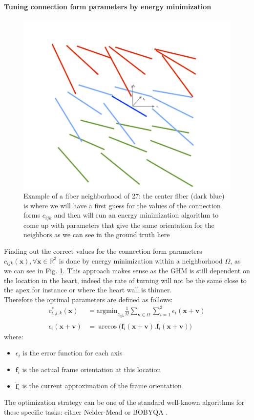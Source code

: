 \paragraph{Tuning connection form parameters by energy minimization} \label{fitting_method}

\begin{figure}[!t]
    \centering
    \includegraphics[width=.78\textwidth]{figures/fibers_neighborhood3d}
    \caption{Example of a fiber neighborhood of 27: the center fiber (dark blue) is where we will have a first guess for the values of the connection forms $c_{ijk}$ and then will run an energy minimization algorithm to come up with parameters that give the same orientation for the neighbors as we can see in the ground truth here}
    \label{fig:fibers_neighborhood3d}
\end{figure}

Finding out the correct values for the connection form parameters $c_{ijk}(\mathbf{x}), \forall \mathbf{x} \in \mathbb{R}^3$ is done by energy minimization within a neighborhood $\Omega$, as we can see in Fig. \ref{fig:fibers_neighborhood3d}. This approach makes sense as the GHM is still dependent on the location in the heart, indeed the rate of turning will not be the same close to the apex for instance or where the heart wall is thinner.\\
Therefore the optimal parameters are defined as follows:
\begin{align*}
    c^*_{i,j,k}(\mathbf{x}) &= \text{argmin}_{c_{ijk}} \frac{1}{\Omega} \sum_{\mathbf{v} \in \Omega} \sum_{i = 1}^3 \epsilon_i(\mathbf{x} + \mathbf{v}) \\
    \epsilon_i(\mathbf{x} + \mathbf{v}) &= \arccos \Big( \mathbf{f}_i(\mathbf{x} + \mathbf{v}) . \mathbf{\tilde{f}}_i(\mathbf{x} + \mathbf{v}) \Big)
\end{align*}
where:
\begin{itemize}
    \item $\epsilon_i$ is the error function for each axis 
    \item $\mathbf{f}_i$ is the actual frame orientation at this location
    \item $\mathbf{\tilde{f}}_i$ is the current approximation of the frame orientation
\end{itemize}
The optimization strategy can be one of the standard well-known algorithms for these specific tasks: either Nelder-Mead \cite{press2007numerical} or BOBYQA \cite{powell2009bobyqa}.


